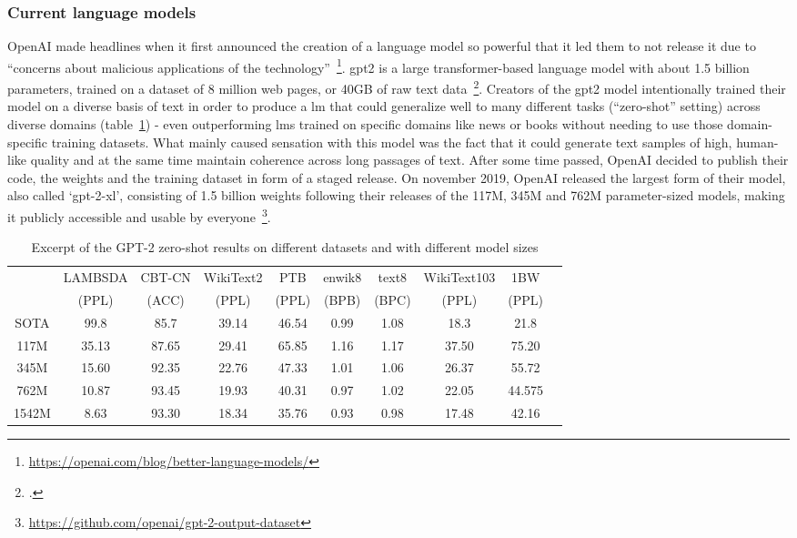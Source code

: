 \subsubsection{Current language models}
\label{sub:current_language models}

OpenAI made headlines when it first announced the creation of a language model so powerful that it led them to not release it due to ``concerns about malicious applications of the technology''~\footnote{\url{https://openai.com/blog/better-language-models/}}. \gls{gpt2} is a large transformer-based language model with about 1.5 billion parameters, trained on a dataset of 8 million web pages, or 40GB of raw text data~\footcite{radford2019language}. Creators of the \gls{gpt2} model intentionally trained their model on a diverse basis of text in order to produce a \gls{lm} that could generalize well to many different tasks (``zero-shot'' setting) across diverse domains (table~\ref{tab:gpt2_benchmark_scores}) - even outperforming \gls{lm}s trained on specific domains like news or books without needing to use those domain-specific training datasets. What mainly caused sensation with this model was the fact that it could generate text samples of high, human-like quality and at the same time maintain coherence across long passages of text. After some time passed, OpenAI decided to publish their code, the weights and the training dataset in form of a staged release. On november 2019, OpenAI released the largest form of their model, also called `gpt-2-xl', consisting of 1.5 billion weights following their releases of the 117M, 345M and 762M parameter-sized models, making it publicly accessible and usable by everyone~\footnote{\url{https://github.com/openai/gpt-2-output-dataset}}.

\begin{table}
	\centering
	\caption{Excerpt of the GPT-2 zero-shot results on different datasets and with different model sizes}
	\begin{tabular}{ cccccccccc }
		\hline
		& LAMBSDA & CBT-CN & WikiText2 & PTB & enwik8 & text8 & WikiText103 & 1BW \\
		& (PPL) & (ACC) & (PPL) & (PPL) & (BPB) & (BPC) & (PPL) & (PPL) \\ \hline
		SOTA & 99.8 & 85.7 & 39.14 & 46.54 & 0.99 & 1.08 & 18.3 & 21.8 \\ \hline
		117M & 35.13 & 87.65 & 29.41 & 65.85 & 1.16 & 1.17 & 37.50 & 75.20 \\
		345M & 15.60 & 92.35 & 22.76 & 47.33 & 1.01 & 1.06 & 26.37 & 55.72 \\
		762M & 10.87 & 93.45 & 19.93 & 40.31 & 0.97 & 1.02 & 22.05 & 44.575 \\
		1542M & 8.63 & 93.30 & 18.34 & 35.76 & 0.93 & 0.98 & 17.48 & 42.16 \\ \hline
	\end{tabular}
	\label{tab:gpt2_benchmark_scores}
\end{table}

